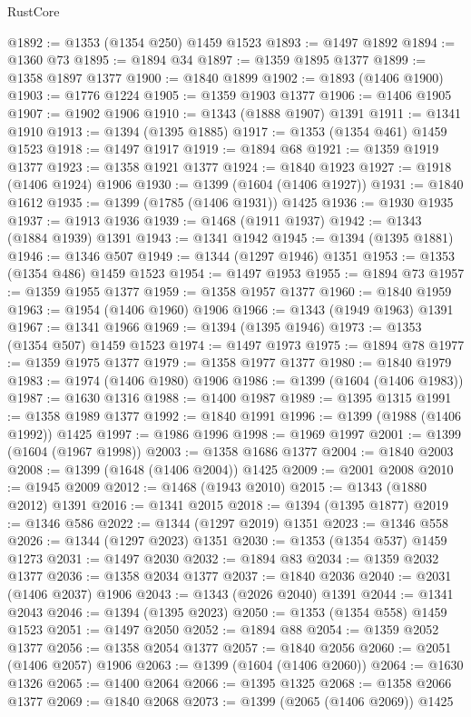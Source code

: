 \begin{lexlean}{RustCore}
\begin{coremodule}
@1892 := @1353 (@1354 @250) @1459 @1523
@1893 := @1497 @1892
@1894 := @1360 @73
@1895 := @1894 @34
@1897 := @1359 @1895 @1377
@1899 := @1358 @1897 @1377
@1900 := @1840 @1899
@1902 := @1893 (@1406 @1900)
@1903 := @1776 @1224
@1905 := @1359 @1903 @1377
@1906 := @1406 @1905
@1907 := @1902 @1906
@1910 := @1343 (@1888 @1907) @1391
@1911 := @1341 @1910
@1913 := @1394 (@1395 @1885)
@1917 := @1353 (@1354 @461) @1459 @1523
@1918 := @1497 @1917
@1919 := @1894 @68
@1921 := @1359 @1919 @1377
@1923 := @1358 @1921 @1377
@1924 := @1840 @1923
@1927 := @1918 (@1406 @1924) @1906
@1930 := @1399 (@1604 (@1406 @1927))
@1931 := @1840 @1612
@1935 := @1399 (@1785 (@1406 @1931)) @1425
@1936 := @1930 @1935
@1937 := @1913 @1936
@1939 := @1468 (@1911 @1937)
@1942 := @1343 (@1884 @1939) @1391
@1943 := @1341 @1942
@1945 := @1394 (@1395 @1881)
@1946 := @1346 @507
@1949 := @1344 (@1297 @1946) @1351
@1953 := @1353 (@1354 @486) @1459 @1523
@1954 := @1497 @1953
@1955 := @1894 @73
@1957 := @1359 @1955 @1377
@1959 := @1358 @1957 @1377
@1960 := @1840 @1959
@1963 := @1954 (@1406 @1960) @1906
@1966 := @1343 (@1949 @1963) @1391
@1967 := @1341 @1966
@1969 := @1394 (@1395 @1946)
@1973 := @1353 (@1354 @507) @1459 @1523
@1974 := @1497 @1973
@1975 := @1894 @78
@1977 := @1359 @1975 @1377
@1979 := @1358 @1977 @1377
@1980 := @1840 @1979
@1983 := @1974 (@1406 @1980) @1906
@1986 := @1399 (@1604 (@1406 @1983))
@1987 := @1630 @1316
@1988 := @1400 @1987
@1989 := @1395 @1315
@1991 := @1358 @1989 @1377
@1992 := @1840 @1991
@1996 := @1399 (@1988 (@1406 @1992)) @1425
@1997 := @1986 @1996
@1998 := @1969 @1997
@2001 := @1399 (@1604 (@1967 @1998))
@2003 := @1358 @1686 @1377
@2004 := @1840 @2003
@2008 := @1399 (@1648 (@1406 @2004)) @1425
@2009 := @2001 @2008
@2010 := @1945 @2009
@2012 := @1468 (@1943 @2010)
@2015 := @1343 (@1880 @2012) @1391
@2016 := @1341 @2015
@2018 := @1394 (@1395 @1877)
@2019 := @1346 @586
@2022 := @1344 (@1297 @2019) @1351
@2023 := @1346 @558
@2026 := @1344 (@1297 @2023) @1351
@2030 := @1353 (@1354 @537) @1459 @1273
@2031 := @1497 @2030
@2032 := @1894 @83
@2034 := @1359 @2032 @1377
@2036 := @1358 @2034 @1377
@2037 := @1840 @2036
@2040 := @2031 (@1406 @2037) @1906
@2043 := @1343 (@2026 @2040) @1391
@2044 := @1341 @2043
@2046 := @1394 (@1395 @2023)
@2050 := @1353 (@1354 @558) @1459 @1523
@2051 := @1497 @2050
@2052 := @1894 @88
@2054 := @1359 @2052 @1377
@2056 := @1358 @2054 @1377
@2057 := @1840 @2056
@2060 := @2051 (@1406 @2057) @1906
@2063 := @1399 (@1604 (@1406 @2060))
@2064 := @1630 @1326
@2065 := @1400 @2064
@2066 := @1395 @1325
@2068 := @1358 @2066 @1377
@2069 := @1840 @2068
@2073 := @1399 (@2065 (@1406 @2069)) @1425

\end{coremodule}
\end{lexlean}
